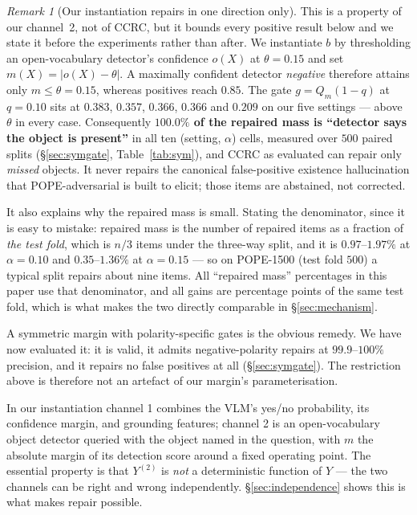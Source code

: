 \documentclass[review,number,doubleblind]{elsarticle}
\theoremstyle{plain}
\theoremstyle{definition}
\theoremstyle{remark}
\newtheorem{remark}{Remark}
\begin{document}
\begin{remark}[Our instantiation repairs in one direction only]
\label{rem:onedir}
This is a property of our channel~2, not of CCRC, but it bounds every positive result below
and we state it before the experiments rather than after. We instantiate $b$ by thresholding
an open-vocabulary detector's confidence $o(X)$ at $\theta=0.15$ and set
$m(X)=|o(X)-\theta|$. A maximally confident detector \emph{negative} therefore attains only
$m\le\theta=0.15$, whereas positives reach $0.85$. The gate $g=Q_m(1-q)$ at $q=0.10$ sits at
$0.383$, $0.357$, $0.366$, $0.366$ and $0.209$ on our five settings --- above $\theta$ in every
case. Consequently \textbf{$100.0\%$ of the repaired mass is ``detector says the object is
present''} in all ten (setting, $\alpha$) cells, measured over $500$ paired splits
(\S\ref{sec:symgate}, Table~\ref{tab:sym}), and CCRC as evaluated can repair only \emph{missed}
objects. It never repairs the canonical false-positive existence hallucination that
POPE-adversarial is built to elicit; those items are abstained, not corrected.

It also explains why the repaired mass is small. Stating the denominator, since it is easy to
mistake: repaired mass is the number of repaired items as a fraction of \emph{the test fold},
which is $n/3$ items under the three-way split, and it is $0.97$--$1.97\%$ at $\alpha=0.10$ and
$0.35$--$1.36\%$ at $\alpha=0.15$ --- so on POPE-1500 (test fold $500$) a typical split repairs
about nine items. All ``repaired mass'' percentages in this paper use that denominator, and all
gains are percentage points of the same test fold, which is what makes the two directly
comparable in \S\ref{sec:mechanism}.

A symmetric margin with polarity-specific gates is the obvious remedy. We have now evaluated
it: it is valid, it admits negative-polarity repairs at $99.9$--$100\%$ precision, and it
repairs no false positives at all (\S\ref{sec:symgate}). The restriction above is therefore not
an artefact of our margin's parameterisation.
\end{remark}

In our instantiation channel 1 combines the VLM's yes/no probability, its confidence
margin, and grounding features; channel 2 is an open-vocabulary object detector
\citep{owlv2} queried with the object named in the question, with $m$ the absolute margin of
its detection score around a fixed operating point. The essential property is that
$Y^{(2)}$ is \emph{not} a deterministic function of $Y$ --- the two channels can be right
and wrong independently. \S\ref{sec:independence} shows this is what makes repair possible.
\end{document}
